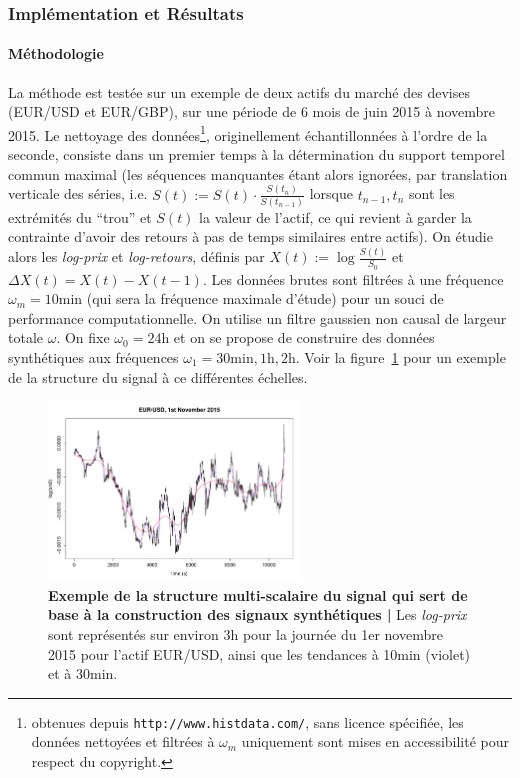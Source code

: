 \subsubsection{Implémentation et Résultats}

\paragraph{Méthodologie}

La méthode est testée sur un exemple de deux actifs du marché des devises (EUR/USD et EUR/GBP), sur une période de 6 mois de juin 2015 à novembre 2015. Le nettoyage des données\footnote{obtenues depuis \texttt{http://www.histdata.com/}, sans licence spécifiée, les données nettoyées et filtrées à $\omega_m$ uniquement sont mises en accessibilité pour respect du copyright.}, originellement échantillonnées à l'ordre de la seconde, consiste dans un premier temps à la détermination du support temporel commun maximal (les séquences manquantes étant alors ignorées, par translation verticale des séries, i.e. $S(t):=S(t)\cdot \frac{S(t_{n})}{S(t_{n-1})}$ lorsque $t_{n-1},t_n$ sont les extrémités du ``trou'' et $S(t)$ la valeur de l'actif, ce qui revient à garder la contrainte d'avoir des retours à pas de temps similaires entre actifs). On étudie alors les \emph{log-prix} et \emph{log-retours}, définis par $X(t):=\log{\frac{S(t)}{S_0}}$ et $\Delta X (t) = X(t) - X(t-1)$. Les données brutes sont filtrées à une fréquence $\omega_m = 10\textrm{min}$ (qui sera la fréquence maximale d'étude) pour un souci de performance computationnelle. On utilise un filtre gaussien non causal de largeur totale $\omega$. On fixe $\omega_0=24\textrm{h}$ et on se propose de construire des données synthétiques aux fréquences $\omega_1 = 30\textrm{min},1\textrm{h},2\textrm{h}$. Voir la figure~\ref{fig:example_signal} pour un exemple de la structure du signal à ce différentes échelles.


\begin{figure}%
\centering
\includegraphics[width=0.6\textwidth,height=0.25\textheight]{figures/asset/ex_filtering}
\caption{\textbf{Exemple de la structure multi-scalaire du signal qui sert de base à la construction des signaux synthétiques | } Les \emph{log-prix} sont représentés sur environ 3h pour la journée du 1er novembre 2015 pour l'actif EUR/USD, ainsi que les tendances à 10min (violet) et à 30min.}
\label{fig:example_signal}
\end{figure}



